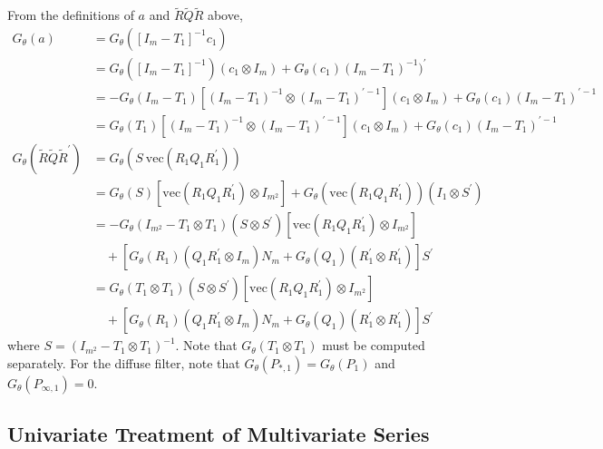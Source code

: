 \documentclass[12pt]{article}
\newcommand{\Gt}{G_\theta}
\newcommand{\vecop}[0]{\text{vec}}
\begin{document}
	From the definitions of $a$ and $\tilde{R} \tilde{Q} \tilde{R}$ above, 
	\begin{align*}
	\Gt(a) &= \Gt([I_m - T_1]^{-1} c_1) \\ 
		&= \Gt([I_m - T_1]^{-1}) (c_1 \otimes I_m) + \Gt(c_1) (I_m - T_1)^{-1})^\prime \\ 
		&= -\Gt(I_m - T_1) [(I_m - T_1)^{-1} \otimes (I_m - T_1)^{\prime-1} ](c_1 \otimes I_m) +  \Gt(c_1) (I_m - T_1)^{\prime-1} \\ 
		&= \Gt(T_1) [(I_m - T_1)^{-1} \otimes (I_m - T_1)^{\prime-1}] (c_1 \otimes I_m) +  \Gt(c_1) (I_m - T_1)^{\prime-1} \\
	\Gt(\tilde{R} \tilde{Q} \tilde{R}^\prime) &= \Gt(S \ \vecop(R_1 Q_1 R_1^\prime))\\
		&= \Gt(S) [\vecop(R_1 Q_1 R_1^\prime) \otimes I_{m^2}] + \Gt(\vecop(R_1 Q_1 R_1^\prime))(I_1 \otimes S^\prime) \\
		&= -\Gt(I_{m^2} - T_1 \otimes T_1)(S \otimes S^\prime) [\vecop(R_1 Q_1 R_1^\prime) \otimes I_{m^2}]\\ 
		&\quad + [\Gt(R_1)(Q_1 R_1^\prime \otimes I_m) N_m + \Gt(Q_1)(R_1^\prime \otimes R_1^\prime)] S^\prime \\
		&= \Gt(T_1 \otimes T_1)(S \otimes S^\prime) [\vecop(R_1 Q_1 R_1^\prime) \otimes I_{m^2}] \\
		&\quad + [\Gt(R_1)(Q_1 R_1^\prime \otimes I_m) N_m + \Gt(Q_1)(R_1^\prime \otimes R_1^\prime)] S^\prime
	\end{align*}
	where $S = (I_{m^2} - T_1 \otimes T_1)^{-1}$. Note that $\Gt(T_1 \otimes T_1)$ must be computed separately. For the diffuse filter, note that $\Gt(P_{*,1}) = \Gt(P_1)$ and $\Gt(P_{\infty,1}) = 0$.

\subsection{Univariate Treatment of Multivariate Series}
\end{document}
